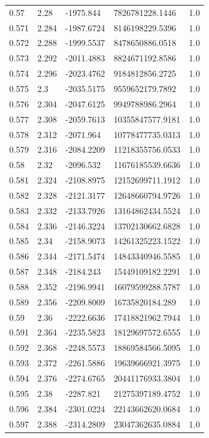 \begin{tabular}{lllll}
0.57 & 2.28 & -1975.844 & 7826781228.1446 & 1.0 \\
0.571 & 2.284 & -1987.6724 & 8146198229.5396 & 1.0 \\
0.572 & 2.288 & -1999.5537 & 8478650886.0518 & 1.0 \\
0.573 & 2.292 & -2011.4883 & 8824671192.8586 & 1.0 \\
0.574 & 2.296 & -2023.4762 & 9184812856.2725 & 1.0 \\
0.575 & 2.3 & -2035.5175 & 9559652179.7892 & 1.0 \\
0.576 & 2.304 & -2047.6125 & 9949788986.2964 & 1.0 \\
0.577 & 2.308 & -2059.7613 & 10355847577.9181 & 1.0 \\
0.578 & 2.312 & -2071.964 & 10778477735.0313 & 1.0 \\
0.579 & 2.316 & -2084.2209 & 11218355756.0533 & 1.0 \\
0.58 & 2.32 & -2096.532 & 11676185539.6636 & 1.0 \\
0.581 & 2.324 & -2108.8975 & 12152699711.1912 & 1.0 \\
0.582 & 2.328 & -2121.3177 & 12648660794.9726 & 1.0 \\
0.583 & 2.332 & -2133.7926 & 13164862434.5524 & 1.0 \\
0.584 & 2.336 & -2146.3224 & 13702130662.6828 & 1.0 \\
0.585 & 2.34 & -2158.9073 & 14261325223.1522 & 1.0 \\
0.586 & 2.344 & -2171.5474 & 14843340946.5585 & 1.0 \\
0.587 & 2.348 & -2184.243 & 15449109182.2291 & 1.0 \\
0.588 & 2.352 & -2196.9941 & 16079599288.5787 & 1.0 \\
0.589 & 2.356 & -2209.8009 & 16735820184.289 & 1.0 \\
0.59 & 2.36 & -2222.6636 & 17418821962.7944 & 1.0 \\
0.591 & 2.364 & -2235.5823 & 18129697572.6555 & 1.0 \\
0.592 & 2.368 & -2248.5573 & 18869584566.5095 & 1.0 \\
0.593 & 2.372 & -2261.5886 & 19639666921.3975 & 1.0 \\
0.594 & 2.376 & -2274.6765 & 20441176933.3804 & 1.0 \\
0.595 & 2.38 & -2287.821 & 21275397189.4752 & 1.0 \\
0.596 & 2.384 & -2301.0224 & 22143662620.0684 & 1.0 \\
0.597 & 2.388 & -2314.2809 & 23047362635.0884 & 1.0 \\

\end{tabular}
